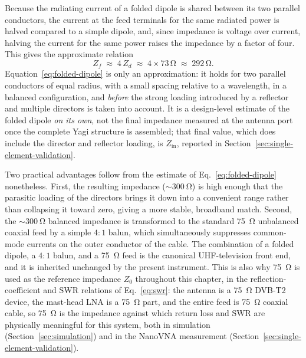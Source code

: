 Because the radiating current of a folded dipole is shared between its two
parallel conductors, the current at the feed terminals for the same radiated
power is halved compared to a simple dipole, and, since impedance is voltage
over current, halving the current for the same power raises the impedance by
a factor of four. This gives the approximate relation
\begin{equation}
    Z_f \;\approx\; 4\,Z_d \;\approx\; 4 \times 73\,\si{\ohm}
    \;\approx\; 292\,\si{\ohm}.
    \label{eq:folded-dipole}
\end{equation}
Equation~\eqref{eq:folded-dipole} \citep{balanis2016,kraus1988} is only an
approximation: it holds for two parallel conductors of equal radius, with a
small spacing relative to a wavelength, in a balanced configuration, and
\emph{before} the strong loading introduced by a reflector and multiple
directors is taken into account. It is a design-level estimate of the folded
dipole \emph{on its own}, not the final impedance measured at the antenna
port once the complete Yagi structure is assembled; that final value, which
does include the director and reflector loading, is $Z_\mathrm{in}$, reported
in Section~\ref{sec:single-element-validation}.

Two practical advantages follow from the estimate of Eq.~\eqref{eq:folded-dipole}
nonetheless. First, the resulting impedance ($\sim\!\SI{300}{\ohm}$) is high
enough that the parasitic loading of the directors brings it down into a
convenient range rather than collapsing it toward zero, giving a more stable,
broadband match. Second, the $\sim\!\SI{300}{\ohm}$ balanced impedance is
transformed to the standard \SI{75}{\ohm} unbalanced coaxial feed by a simple
$4{:}1$ balun, which simultaneously suppresses common-mode currents on the
outer conductor of the cable. The combination of a folded dipole, a $4{:}1$
balun, and a \SI{75}{\ohm} feed is the canonical UHF-television front end,
and it is inherited unchanged by the present instrument. This is also why
\SI{75}{\ohm} is used as the reference impedance $Z_0$ throughout this
chapter, in the reflection-coefficient and SWR relations of
Eq.~\eqref{eq:swr}: the antenna is a \SI{75}{\ohm} DVB-T2 device, the
mast-head LNA is a \SI{75}{\ohm} part, and the entire feed is \SI{75}{\ohm}
coaxial cable, so \SI{75}{\ohm} is the impedance against which return loss
and SWR are physically meaningful for this system, both in simulation
(Section~\ref{sec:simulation}) and in the NanoVNA measurement
(Section~\ref{sec:single-element-validation}).

